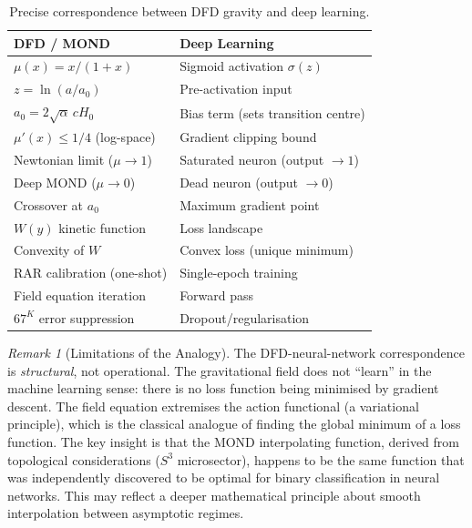 \documentclass[11pt]{article}
\theoremstyle{definition}
\theoremstyle{remark}
\newtheorem{remark}[theorem]{Remark}
\begin{document}
\begin{table}[ht]
\centering
\caption{Precise correspondence between DFD gravity and deep learning.}
\label{tab:dl-dictionary}
\begin{tabular}{@{}ll@{}}
\toprule
\textbf{DFD / MOND} & \textbf{Deep Learning} \\
\midrule
$\mu(x) = x/(1+x)$ & Sigmoid activation $\sigma(z)$ \\
$z = \ln(a/a_0)$ & Pre-activation input \\
$a_0 = 2\sqrt{\alpha}\,cH_0$ & Bias term (sets transition centre) \\
$\mu'(x) \leq 1/4$ (log-space) & Gradient clipping bound \\
Newtonian limit ($\mu \to 1$) & Saturated neuron (output $\to 1$) \\
Deep MOND ($\mu \to 0$) & Dead neuron (output $\to 0$) \\
Crossover at $a_0$ & Maximum gradient point \\
$W(y)$ kinetic function & Loss landscape \\
Convexity of $W$ & Convex loss (unique minimum) \\
RAR calibration (one-shot) & Single-epoch training \\
Field equation iteration & Forward pass \\
$67^K$ error suppression & Dropout/regularisation \\
\bottomrule
\end{tabular}
\end{table}

\begin{remark}[Limitations of the Analogy]
\label{rem:analogy-limits}
The DFD-neural-network correspondence is \emph{structural}, not
operational. The gravitational field does not ``learn'' in the machine
learning sense: there is no loss function being minimised by gradient
descent. The field equation extremises the action functional (a
variational principle), which is the classical analogue of finding the
global minimum of a loss function. The key insight is that the MOND
interpolating function, derived from topological considerations ($S^3$
microsector), happens to be the same function that was independently
discovered to be optimal for binary classification in neural networks.
This may reflect a deeper mathematical principle about smooth
interpolation between asymptotic regimes.
\end{remark}

\end{document}
